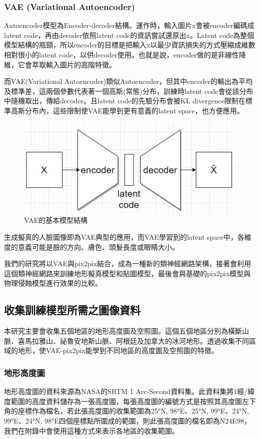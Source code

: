 \documentclass[a4paper, 12pt]{article}
\begin{document}
\subsubsection{VAE (Variational Autoencoder)}
Autoencoder模型為Encoder-decoder結構。運作時，輸入圖片x會被encoder編碼成latent code，再由decoder依照latent code的資訊嘗試還原出x。Latent code為整個模型結構的瓶頸，所以encoder的目標是把輸入x以最少資訊損失的方式壓縮成維數相對很小的latent code，以供decoder使用。也就是說，encoder做的是非線性降維，它會萃取輸入圖片的高階特徵。

而VAE(Variational Autoencoder)\cite{kingma2013auto}類似Autoencoder，但其中encoder的輸出為平均及標準差，這兩個參數代表著一個高斯(常態)分布，訓練時latent code會從該分布中隨機取出，傳給decoder。且latent code的先驗分布會被KL divergence限制在標準高斯分布內，這些限制使VAE能學到更有意義的latent space，也方便應用。

\begin{figure}[htbp]
    \centering
    \includegraphics[width=0.5\linewidth]{fig/6.jpg}
    \caption{VAE的基本模型結構}
    \label{fig:6}
\end{figure}

生成擬真的人臉圖像即為VAE典型的應用，而VAE學習到的latent space中，各維度的意義可能是臉的方向、膚色、頭髮長度或眼睛大小。

我們的研究將以VAE與pix2pix結合，成為一種新的類神經網路架構，接著會利用這個類神經網路來訓練地形擬真模型和貼圖模型，最後會與基礎的pix2pix模型與物理侵蝕模型進行效果的比較。



\subsection{收集訓練模型所需之圖像資料}
本研究主要會收集五個地區的地形高度圖及空照圖。這個五個地區分別為橫斷山脈、喜馬拉雅山、祕魯安地斯山脈、阿根廷及加拿大的冰河地形。透過收集不同區域的地形，使VAE-pix2pix能學到不同地區的高度圖及空照圖的特徵。
\subsubsection{地形高度圖}
地形高度圖的資料來源為NASA的SRTM 1 Arc-Second資料集。此資料集將1經/緯度範圍的高度資料儲存為一張高度圖，每張高度圖的編號方式是按照其高度圖左下角的座標作為檔名，若此張高度圖的收集範圍為25°N, 98°E、25°N, 99°E、24°N, 99°E、24°N, 98°E四個座標點所圍成的範圍，則此張高度圖的檔名即為N24E98，我們在附錄中會使用這種方式來表示各地區的收集範圍。
\end{document}
